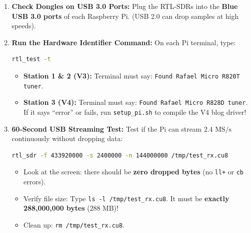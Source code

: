 \documentclass[11pt,a4paper]{article}
\begin{document}
\begin{enumerate}[leftmargin=*]
    \item \textbf{Check Dongles on USB 3.0 Ports:}
    Plug the RTL-SDRs into the \textbf{Blue USB 3.0 ports} of each Raspberry Pi. (USB 2.0 can drop samples at high speeds).
    
    \item \textbf{Run the Hardware Identifier Command:}
    On each Pi terminal, type:
    \begin{lstlisting}[language=bash, basicstyle=\small\ttfamily, backgroundcolor=\color{lightbg}, frame=single]
rtl_test -t
    \end{lstlisting}
    \begin{itemize}
        \item \textbf{Station 1 \& 2 (V3):} Terminal must say: \texttt{Found Rafael Micro R820T tuner}.
        \item \textbf{Station 3 (V4):} Terminal must say: \texttt{Found Rafael Micro R828D tuner}. If it says ``error'' or fails, run \texttt{setup\_pi.sh} to compile the V4 blog driver!
    \end{itemize}

    \item \textbf{60-Second USB Streaming Test:}
    Test if the Pi can stream $2.4\text{ MS/s}$ continuously without dropping data:
    \begin{lstlisting}[language=bash, basicstyle=\small\ttfamily, backgroundcolor=\color{lightbg}, frame=single]
rtl_sdr -f 433920000 -s 2400000 -n 144000000 /tmp/test_rx.cu8
    \end{lstlisting}
    \begin{itemize}
        \item Look at the screen: there should be \textbf{zero dropped bytes} (no \texttt{ll+} or \texttt{cb} errors).
        \item Verify file size: Type \texttt{ls -l /tmp/test_rx.cu8}. It must be \textbf{exactly 288,000,000 bytes} ($288\text{ MB}$)!
        \item Clean up: \texttt{rm /tmp/test_rx.cu8}.
    \end{itemize}
\end{enumerate}
\end{document}

